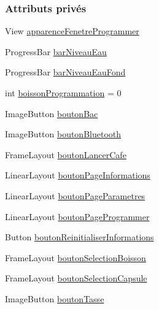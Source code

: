 \subsubsection*{Attributs privés}
\begin{DoxyCompactItemize}
\item 
View \hyperlink{classcom_1_1example_1_1ekawa_1_1_ihm_aa8beb9a05b4f2c2030b9829642f87d3f}{apparence\+Fenetre\+Programmer}
\item 
Progress\+Bar \hyperlink{classcom_1_1example_1_1ekawa_1_1_ihm_a9023d37b98385b21d2b5dd6910c13020}{bar\+Niveau\+Eau}
\item 
Progress\+Bar \hyperlink{classcom_1_1example_1_1ekawa_1_1_ihm_a104a80153a74a9cbcbd757c24ce84a36}{bar\+Niveau\+Eau\+Fond}
\item 
int \hyperlink{classcom_1_1example_1_1ekawa_1_1_ihm_a6ad8136ec35fff9e96476c4f35726fea}{boisson\+Programmation} = 0
\item 
Image\+Button \hyperlink{classcom_1_1example_1_1ekawa_1_1_ihm_a6c4ca9f4166d4ceee1bee82b4f7508a4}{bouton\+Bac}
\item 
Image\+Button \hyperlink{classcom_1_1example_1_1ekawa_1_1_ihm_a0c2ec4e1fa0085520fa9db31ee4284fc}{bouton\+Bluetooth}
\item 
Frame\+Layout \hyperlink{classcom_1_1example_1_1ekawa_1_1_ihm_af64465b03533ddddfaac1a55b0f14012}{bouton\+Lancer\+Cafe}
\item 
Linear\+Layout \hyperlink{classcom_1_1example_1_1ekawa_1_1_ihm_a93dd279f2c6fa8d4e22ce298b1c4ab16}{bouton\+Page\+Informations}
\item 
Linear\+Layout \hyperlink{classcom_1_1example_1_1ekawa_1_1_ihm_a11fe63d247e6b4966aac0086c06bd495}{bouton\+Page\+Parametres}
\item 
Linear\+Layout \hyperlink{classcom_1_1example_1_1ekawa_1_1_ihm_a15ad5787c0800a7a2e2f00964787255f}{bouton\+Page\+Programmer}
\item 
Button \hyperlink{classcom_1_1example_1_1ekawa_1_1_ihm_aa910a5ff04c7003b0035f89572310652}{bouton\+Reinitialiser\+Informations}
\item 
Frame\+Layout \hyperlink{classcom_1_1example_1_1ekawa_1_1_ihm_a5aec848e98e7bd8b933b87e390de809e}{bouton\+Selection\+Boisson}
\item 
Frame\+Layout \hyperlink{classcom_1_1example_1_1ekawa_1_1_ihm_a866bc916203a767c5f9def913b59175d}{bouton\+Selection\+Capsule}
\item 
Image\+Button \hyperlink{classcom_1_1example_1_1ekawa_1_1_ihm_a32e7322f35858a93cdfb75e06f788842}{bouton\+Tasse}
\item 

\end{DoxyCompactItemize}
